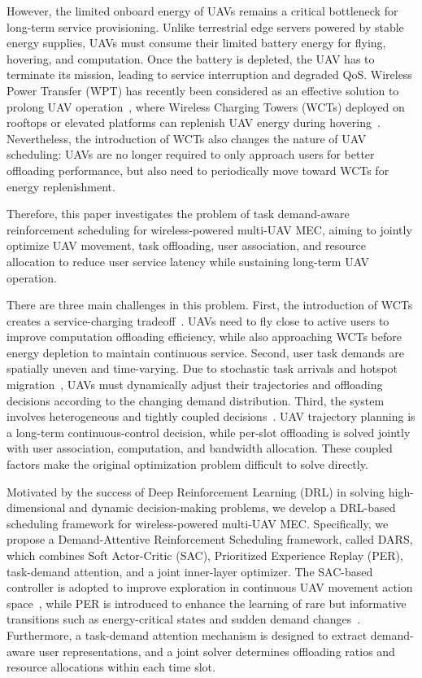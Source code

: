 \documentclass[journal]{IEEEtran}
\begin{document}
However, the limited onboard energy of UAVs remains a critical bottleneck for long-term service provisioning. Unlike terrestrial edge servers powered by stable energy supplies, UAVs must consume their limited battery energy for flying, hovering, and computation. Once the battery is depleted, the UAV has to terminate its mission, leading to service interruption and degraded QoS. Wireless Power Transfer (WPT) has recently been considered as an effective solution to prolong UAV operation~\cite{xu2018uav, 
ning2025joint_data}, where Wireless Charging Towers (WCTs) deployed on rooftops or elevated platforms can replenish UAV energy during hovering~\cite{xu2018uav}. Nevertheless, the introduction of WCTs also changes the nature of UAV scheduling: UAVs are no longer required to only approach users for better offloading performance, but also need to periodically move toward WCTs for energy replenishment.

Therefore, this paper investigates the problem of task demand-aware reinforcement scheduling for wireless-powered multi-UAV MEC, aiming to jointly optimize UAV movement, task offloading, user association, and resource allocation to reduce user service latency while sustaining long-term UAV operation.


There are three main challenges in this problem. First, the introduction of WCTs creates a service-charging tradeoff~\cite{song2024energy}. UAVs need to fly close to active users to improve computation offloading efficiency, while also approaching WCTs before energy depletion to maintain continuous service. Second, user task demands are spatially uneven and time-varying. Due to stochastic task arrivals and hotspot migration~\cite{wang2021dynamic_imitation}, UAVs must dynamically adjust their trajectories and offloading decisions according to the changing demand distribution. Third, the system involves heterogeneous and tightly coupled decisions~\cite{wang2024joint}. UAV trajectory planning is a long-term continuous-control decision, while per-slot offloading is solved jointly with user association, computation, and bandwidth allocation. These coupled factors make the original optimization problem difficult to solve directly.

Motivated by the success of Deep Reinforcement Learning (DRL) in solving high-dimensional and dynamic decision-making problems, we develop a DRL-based scheduling framework for wireless-powered multi-UAV MEC. Specifically, we propose a Demand-Attentive Reinforcement Scheduling framework, called DARS, which combines Soft Actor-Critic (SAC), Prioritized Experience Replay (PER), task-demand attention, and a joint inner-layer optimizer. The SAC-based controller is adopted to improve exploration in continuous UAV movement action space~\cite{haarnoja2018soft}, while PER is introduced to enhance the learning of rare but informative transitions such as energy-critical states and sudden demand changes~\cite{schaul2016per}. Furthermore, a task-demand attention mechanism is designed to extract demand-aware user representations, and a joint solver determines offloading ratios and resource allocations within each time slot.
\end{document}
